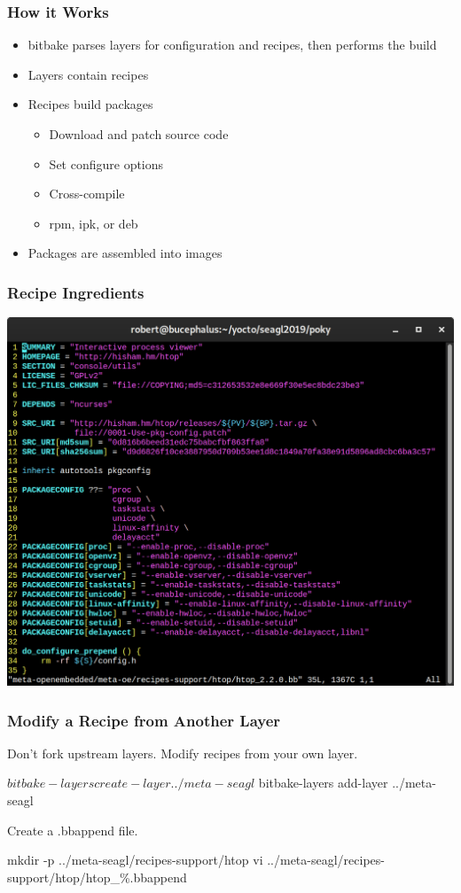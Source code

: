 \documentclass[aspectratio=169]{beamer}
\begin{document}
\begin{frame}
\frametitle{How it Works}
\begin{itemize}
	\item bitbake parses layers for configuration and recipes, then
	      performs the build
	\item Layers contain recipes
	\item Recipes build packages
	\begin{itemize}
		\item Download and patch source code
		\item Set configure options
		\item Cross-compile
		\item rpm, ipk, or deb
	\end{itemize}
	\item Packages are assembled into images
\end{itemize}
\end{frame}

\begin{frame}
\frametitle{Recipe Ingredients}
\begin{center}
	\includegraphics[width=\textwidth,height=0.9\textheight,keepaspectratio]{images/htop.png}
\end{center}
\end{frame}

\begin{frame}[fragile]
\frametitle{Modify a Recipe from Another Layer}
Don't fork upstream layers. Modify recipes from your own layer.
\begin{block}{}
\begin{semiverbatim}
$ bitbake-layers create-layer ../meta-seagl
$ bitbake-layers add-layer ../meta-seagl
\end{semiverbatim}
\end{block}
Create a .bbappend file.
\begin{block}{}
\begin{semiverbatim}
mkdir -p ../meta-seagl/recipes-support/htop
vi ../meta-seagl/recipes-support/htop/htop\_\%.bbappend
\end{semiverbatim}
\end{block}
\end{frame}
\end{document}
